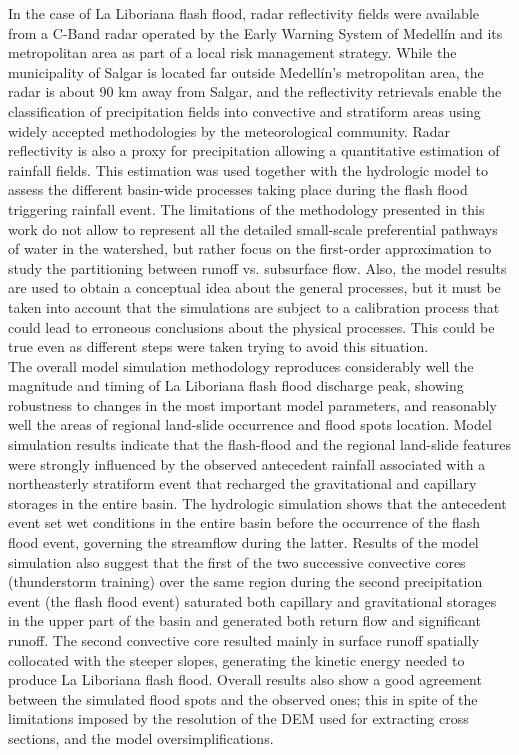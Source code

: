 \documentclass[hess, manuscript]{copernicus}
\begin{document}
In the case of La Liboriana flash flood, radar reflectivity fields were available from a C-Band radar operated by the Early Warning System of Medellín and its metropolitan area as part of a local risk management strategy. While the municipality of Salgar is located far outside Medellín's metropolitan area, the radar is about 90 km away from Salgar, and the reflectivity retrievals enable the classification of precipitation fields into convective and stratiform areas using widely accepted methodologies by the meteorological community.  Radar reflectivity is also a proxy for precipitation allowing a quantitative estimation of rainfall fields. This estimation was used together with the hydrologic model to assess the different basin-wide processes taking place during the flash flood triggering rainfall event.  The limitations of the methodology presented in this work do not allow to represent all the detailed small-scale preferential pathways of water in the watershed, but rather focus on the first-order approximation to study the partitioning between runoff vs. subsurface flow. Also, the model results are used to obtain a conceptual idea about the general processes, but it must be taken into account that the simulations are subject to a calibration process that could lead to erroneous conclusions about the physical processes. This could be true even as different steps were taken trying to avoid this situation.  \\

The overall model simulation methodology reproduces considerably well the magnitude and timing of La Liboriana flash flood discharge peak, showing robustness to changes in the most important model parameters, and reasonably well the areas of regional land-slide occurrence and flood spots location.  Model simulation results indicate that the flash-flood and the regional land-slide features were strongly influenced by the observed antecedent rainfall associated with a northeasterly stratiform event that recharged the gravitational and capillary storages in the entire basin. The hydrologic simulation shows that the antecedent event set wet conditions in the entire basin before the occurrence of the flash flood event, governing the streamflow during the latter.  Results of the model simulation also suggest that the first of the two successive convective cores (thunderstorm training) over the same region during the second precipitation event (the flash flood event) saturated both capillary and gravitational storages in the upper part of the basin and generated both return flow and significant runoff.  The second convective core resulted mainly in surface runoff spatially collocated with the steeper slopes, generating the kinetic energy needed to produce La Liboriana flash flood. Overall results also show a good agreement between the simulated flood spots and the observed ones; this in spite of the limitations imposed by the resolution of the DEM used for extracting cross sections, and the model oversimplifications. \\
\end{document}
